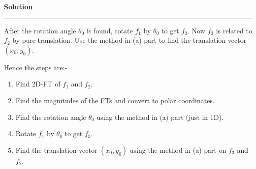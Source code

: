 \documentclass[a4paper,12pt]{article}
\newenvironment{solution}[2][]{%
\begin{mdframed}[linecolor=blue!70!black, linewidth=2pt, roundcorner=10pt, backgroundcolor=yellow!10!white, skipabove=12pt, skipbelow=12pt]%
	\textbf{\large #2}
	\par\noindent\rule{\textwidth}{0.4pt}
}{
\end{mdframed}
}
\begin{document}
\begin{solution}{Solution}
	After the rotation angle $\theta_0$ is found, rotate $f_1$ by $\theta_0$ to get $f_3$. Now $f_3$ is related to $f_2$ by pure translation. Use the method in (a) part to find the translation vector $(x_0, y_0)$.

	Hence the steps are:-
	\begin{enumerate}
		\item Find 2D-FT of $f_1$ and $f_2$.
		\item Find the magnitudes of the FTs and convert to polar coordinates.
		\item Find the rotation angle $\theta_0$ using the method in (a) part (just in 1D).
		\item Rotate $f_1$ by $\theta_0$ to get $f_3$.
		\item Find the translation vector $(x_0, y_0)$ using the method in (a) part on $f_3$ and $f_2$.
	\end{enumerate}
\end{solution}
\end{document}

